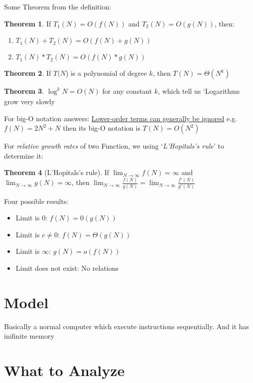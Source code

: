 \documentclass[12pt]{article}
\theoremstyle{definition}
\newtheorem{theorem}{Theorem}[section]
\begin{document}
Some Theorem from the definition:
\begin{theorem}
    If $T_1(N) = O(f(N))$ and $T_2(N) = O(g(N))$, then:
    \begin{enumerate}
        \item $T_1(N) + T_2(N) = O(f(N) + g(N))$
        \item $T_1(N) * T_2(N) = O(f(N) * g(N))$
    \end{enumerate}
\end{theorem}

\begin{theorem}
    If $T(N$) is a polynomial of degree $k$, then $T(N) = \Theta(N^k)$
\end{theorem}

\begin{theorem}
    $\log^k_{}N = O(N)$ for any constant $k$, which tell us `Logarithms grow very slowly
\end{theorem}

For big-O notation answers: \underline{Lower-order terms can generally be ignored}
e.g. $f(N) = 2N^2 + N$ then its big-O notation is $T(N) = O(N^2)$

For \emph{relative growth rates} of two Function, we using `\emph{L'Hopitals's rule}' to determine it:
\begin{theorem}[L'Hopitals's rule]
    If $\lim_{N\to\infty}f(N) = \infty$ and $\lim_{N\to\infty}g(N) = \infty$, 
    then $\lim_{N\to\infty} \frac{f(N)}{g(N)} = \lim_{N\to\infty} \frac{f'(N)}{g'(N)}$
\end{theorem} 

Four possible results:
\begin{itemize}
    \item Limit is 0: $f(N) = 0(g(N))$
    \item Limit is $c\neq 0$: $f(N) = \Theta(g(N))$
    \item Limit is $\infty$: $g(N) = o(f(N))$
    \item Limit does not exist: No relations
\end{itemize}

\section{Model}
Basically a normal computer which execute instructions sequentially. And it has inifinite memory

\section{What to Analyze}
\end{document}
